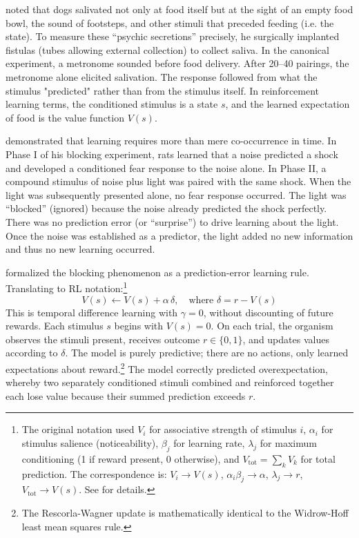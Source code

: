 \citet{Pavlov1927} noted that dogs salivated not only at food itself but at the sight of an empty food bowl, the sound of footsteps, and other stimuli that preceded feeding (i.e. the state). To measure these ``psychic secretions'' precisely, he surgically implanted fistulas (tubes allowing external collection) to collect saliva. In the canonical experiment, a metronome sounded before food delivery. After 20--40 pairings, the metronome alone elicited salivation. The response followed from what the stimulus "predicted" rather than from the stimulus itself. In reinforcement learning terms, the conditioned stimulus is a state $s$, and the learned expectation of food is the value function $V(s)$.

\citet{Kamin1969} demonstrated that learning requires more than mere co-occurrence in time. In Phase I of his blocking experiment, rats learned that a noise predicted a shock and developed a conditioned fear response to the noise alone. In Phase II, a compound stimulus of noise plus light was paired with the same shock. When the light was subsequently presented alone, no fear response occurred. The light was ``blocked'' (ignored) because the noise already predicted the shock perfectly. There was no prediction error (or ``surprise'') to drive learning about the light. Once the noise was established as a predictor, the light added no new information and thus no new learning occurred.

\citet{RescorlaWagner1972} formalized the blocking phenomenon as a prediction-error learning rule. Translating to RL notation:\footnote{The original notation used $V_i$ for associative strength of stimulus $i$, $\alpha_i$ for stimulus salience (noticeability), $\beta_j$ for learning rate, $\lambda_j$ for maximum conditioning (1 if reward present, 0 otherwise), and $V_{\text{tot}} = \sum_k V_k$ for total prediction. The correspondence is: $V_i \to V(s)$, $\alpha_i \beta_j \to \alpha$, $\lambda_j \to r$, $V_{\text{tot}} \to V(s)$. See \citet{SuttonBarto1990} for details.}
\begin{equation}
V(s) \leftarrow V(s) + \alpha \, \delta, \quad \text{where } \delta = r - V(s)
\end{equation}
This is temporal difference learning with $\gamma = 0$, without discounting of future rewards. Each stimulus $s$ begins with $V(s) = 0$. On each trial, the organism observes the stimuli present, receives outcome $r \in \{0, 1\}$, and updates values according to $\delta$. The model is purely predictive; there are no actions, only learned expectations about reward.\footnote{The Rescorla-Wagner update is mathematically identical to the Widrow-Hoff least mean squares rule.} The model correctly predicted overexpectation, whereby two separately conditioned stimuli combined and reinforced together each lose value because their summed prediction exceeds $r$.

